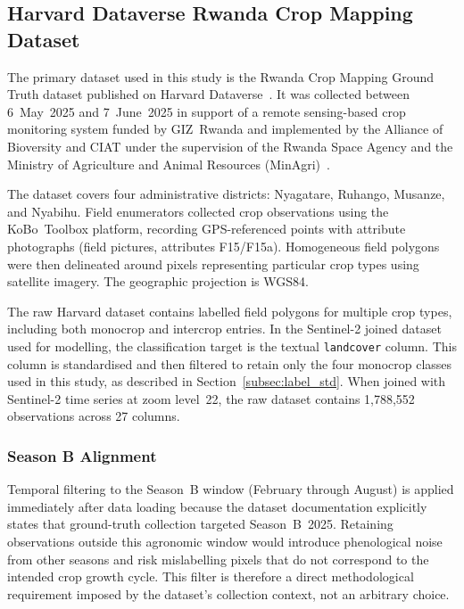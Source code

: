 \subsection{Harvard Dataverse Rwanda Crop Mapping Dataset}
\label{subsec:harvard}

The primary dataset used in this study is the Rwanda Crop Mapping Ground
Truth dataset published on Harvard Dataverse~\cite{harvard2025}. It was
collected between 6~May~2025 and 7~June~2025 in support of a remote
sensing-based crop monitoring system funded by GIZ~Rwanda and implemented
by the Alliance of Bioversity and CIAT under the supervision of the Rwanda
Space Agency and the Ministry of Agriculture and Animal Resources
(MinAgri)~\cite{harvard2025}.

The dataset covers four administrative districts: Nyagatare, Ruhango,
Musanze, and Nyabihu. Field enumerators collected crop observations using
the KoBo~Toolbox platform, recording GPS-referenced points with attribute
photographs (field pictures, attributes F15/F15a). Homogeneous field
polygons were then delineated around pixels representing particular crop
types using satellite imagery. The geographic projection is WGS84.

The raw Harvard dataset contains labelled field polygons for multiple crop
types, including both monocrop and intercrop entries. In the Sentinel-2
joined dataset used for modelling, the classification target is the textual
\texttt{landcover} column. This column is standardised and then filtered to
retain only the four monocrop classes used in this study, as described in
Section~\ref{subsec:label_std}. When joined with Sentinel-2 time series at
zoom level~22, the raw dataset contains 1,788,552 observations across
27 columns.

\subsubsection*{Season B Alignment}
\label{subsubsec:seasonb}

Temporal filtering to the Season~B window (February through August) is
applied immediately after data loading because the dataset documentation
explicitly states that ground-truth collection targeted Season~B~2025.
Retaining observations outside this agronomic window would introduce
phenological noise from other seasons and risk mislabelling pixels that
do not correspond to the intended crop growth cycle. This filter is
therefore a direct methodological requirement imposed by the dataset's
collection context, not an arbitrary choice.


